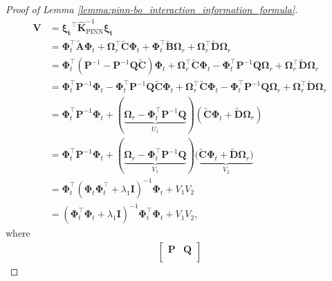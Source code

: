 \begin{proof}[Proof of Lemma \ref{lemma:pinn-bo_interaction_information_formula}]
\begin{align*}
            \mathbf{V} &= \boldsymbol{\boldsymbol{\xi}_t}^\top \mathbf{\widehat{K}}_\mathrm{PINN}^{-1} \boldsymbol{\boldsymbol{\xi}_t} 
\\
            &=\boldsymbol{\Phi}_t^\top \widetilde{\mathbf{A}}\boldsymbol{\Phi}_t + \boldsymbol{\Omega}_r^\top \widetilde{\mathbf{C}}\boldsymbol{\Phi}_t + \boldsymbol{\Phi}_t^\top \widetilde{\mathbf{B}}\boldsymbol{\Omega}_r + \boldsymbol{\Omega}_r^\top \widetilde{\mathbf{D}}\boldsymbol{\Omega}_r 
\\
            & = \boldsymbol{\Phi}_t^\top (\mathbf{P}^{-1} - \mathbf{P}^{-1}\mathbf{Q}\widetilde{\mathbf{C}})\boldsymbol{\Phi}_t + \boldsymbol{\Omega}_r^\top \widetilde{\mathbf{C}}\boldsymbol{\Phi}_t - \boldsymbol{\Phi}_t^\top \mathbf{P}^{-1}\mathbf{Q}\boldsymbol{\Omega}_r + \boldsymbol{\Omega}_r^\top \widetilde{\mathbf{D}}\boldsymbol{\Omega}_r 
\\
            & = \boldsymbol{\Phi}_t^\top \mathbf{P}^{-1}\boldsymbol{\Phi}_t - \boldsymbol{\Phi}_t^\top\mathbf{P}^{-1}\mathbf{Q}\widetilde{\mathbf{C}}\boldsymbol{\Phi}_t + \boldsymbol{\Omega}_r^\top \widetilde{\mathbf{C}}\boldsymbol{\Phi}_t - \boldsymbol{\Phi}_t^\top \mathbf{P}^{-1}\mathbf{Q}\boldsymbol{\Omega}_r + \boldsymbol{\Omega}_r^\top \widetilde{\mathbf{D}}\boldsymbol{\Omega}_r 
\\
            & = \boldsymbol{\Phi}_t^\top \mathbf{P}^{-1}\boldsymbol{\Phi}_t + (\underbrace{\boldsymbol{\Omega}_r - \boldsymbol{\Phi}_t^\top\mathbf{P}^{-1}\mathbf{Q}}_{U_1})(\widetilde{\mathbf{C}}\boldsymbol{\Phi}_t + \widetilde{\mathbf{D}}\boldsymbol{\Omega}_r) 
\\
            & = \boldsymbol{\Phi}_t^\top \mathbf{P}^{-1}\boldsymbol{\Phi}_t + (\underbrace{\boldsymbol{\Omega}_r - \boldsymbol{\Phi}_t^\top\mathbf{P}^{-1}\mathbf{Q}}_{V_1})(\underbrace{\widetilde{\mathbf{C}}\boldsymbol{\Phi}_t + \widetilde{\mathbf{D}}\boldsymbol{\Omega}_r)}_{V_2} \\
            & = \boldsymbol{\Phi}_t^\top (\boldsymbol{\Phi}_t\boldsymbol{\Phi}_t^\top+\lambda_1 \mathbf{I})^{-1} \boldsymbol{\Phi}_t + V_1V_2
\\
            & = (\boldsymbol{\Phi}_t^\top\boldsymbol{\Phi}_t+\lambda_1 \mathbf{I})^{-1} \boldsymbol{\Phi}_t^\top\boldsymbol{\Phi}_t + V_1V_2,
\end{align*}
where 
\begin{align*}
            \begin{bmatrix}
            \mathbf{P} & \mathbf{Q} \\

\end{bmatrix}
\end{align*}
\end{proof}
